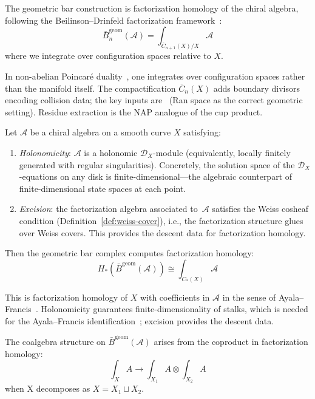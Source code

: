 \begin{definition}\label{def:bar-fh}
The geometric bar construction is factorization homology of the
chiral algebra, following the Beilinson--Drinfeld factorization
framework~\cite[\S3.4]{BD04}:
\[\bar{B}^{\text{geom}}_n(\mathcal{A}) = \int_{\overline{C}_{n+1}(X)/X} \mathcal{A}\]
where we integrate over configuration spaces relative to $X$.
\end{definition}

\begin{remark}\label{rem:why-config-NAP}
In non-abelian Poincar\'e duality~\cite[\S3.4]{BD04}, one integrates
over configuration spaces rather than the manifold itself.  The
compactification $\overline{C}_n(X)$ adds boundary divisors encoding
collision data; the key inputs are~\cite[Theorem~3.4.22, \S3.6]{BD04}
(Ran space as the correct geometric setting).  Residue extraction is
the NAP analogue of the cup product.
\end{remark}

\begin{theorem}\label{thm:bar-NAP-homology}\label{thm:bar-computes-chiral-homology}
Let $\mathcal{A}$ be a chiral algebra on a smooth curve $X$ satisfying:
\begin{enumerate}[label=\textup{(\roman*)}]
\item \emph{Holonomicity}: $\mathcal{A}$ is a holonomic
  $\mathcal{D}_X$-module (equivalently, locally finitely generated
  with regular singularities).  Concretely, the solution space of the
  $\mathcal{D}_X$-equations on any disk is finite-dimensional---the
  algebraic counterpart of finite-dimensional state spaces at each
  point.
\item \emph{Excision}: the factorization algebra associated
  to~$\mathcal{A}$ satisfies the Weiss cosheaf condition
  (Definition~\ref{def:weiss-cover}), i.e., the
  factorization structure glues over Weiss covers.  This
  provides the descent data for factorization homology.
\end{enumerate}
Then the geometric bar complex computes factorization homology:
\[H_*(\bar{B}^{\text{geom}}(\mathcal{A})) \cong \int_{C_*(X)} \mathcal{A}\]

This is factorization homology of $X$ with coefficients in $\mathcal{A}$ in the sense of Ayala--Francis~\cite{AF15}.  Holonomicity guarantees finite-dimensionality of stalks, which is needed for the Ayala--Francis identification~\cite[Theorem~5.1]{AF15}; excision provides the descent data.

The coalgebra structure on $\bar{B}^{\text{geom}}(\mathcal{A})$ arises from the coproduct in factorization homology:
\[\int_X A \to \int_{X_1} A \otimes \int_{X_2} A\]
when X decomposes as $X = X_1 \sqcup X_2$.
\end{theorem}


